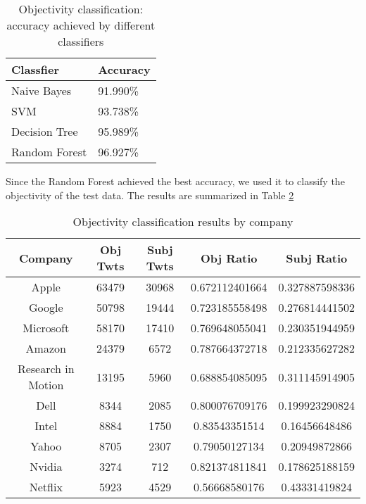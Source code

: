 \documentclass[12pt]{article}
\begin{document}
\begin{table}
\begin{center}
    \begin{tabular}{ | l || l | }
        \hline
        \textbf{Classfier} &  \textbf{Accuracy} \\ \hline
        \hline
        Naive Bayes &  91.990\% \\ \hline
        SVM & 93.738\% \\ \hline
        Decision Tree & 95.989\% \\ \hline
        Random Forest & 96.927\% \\ \hline
    \end{tabular}
\caption{Objectivity classification: accuracy achieved by different classifiers}
\label{classifiers-obj}
\end{center}
\end{table}

Since the Random Forest achieved the best accuracy, we used it to classify the objectivity of the test data. The results are summarized in Table \ref{objectivity-by-company}

\begin{table}
\begin{center}
    \begin{tabular}{ | c || c | c | c | c | }
        \hline
        \textbf{Company} &  \textbf{Obj Twts} & \textbf{Subj Twts} & \textbf{Obj Ratio} & \textbf{Subj Ratio} \\ \hline
        \hline
        Apple &  63479 & 30968 & 0.672112401664 & 0.327887598336 \\ \hline
        Google &  50798 & 19444 & 0.723185558498 & 0.276814441502 \\ \hline
        Microsoft &  58170 & 17410 & 0.769648055041 & 0.230351944959 \\ \hline
        Amazon &  24379 & 6572 & 0.787664372718 & 0.212335627282 \\ \hline
        Research in Motion &  13195 & 5960 & 0.688854085095 & 0.311145914905 \\ \hline
        Dell &  8344 & 2085 & 0.800076709176 & 0.199923290824 \\ \hline
        Intel &  8884 & 1750 & 0.83543351514 & 0.16456648486 \\ \hline
        Yahoo &  8705 & 2307 & 0.79050127134 & 0.20949872866 \\ \hline
        Nvidia &  3274 & 712 & 0.821374811841 & 0.178625188159 \\ \hline
        Netflix &  5923 & 4529 & 0.56668580176 & 0.43331419824 \\ \hline
    \end{tabular}
\caption{Objectivity classification results by company}
\label{objectivity-by-company}
\end{center}
\end{table}
\end{document}

